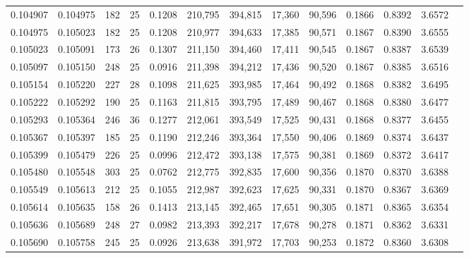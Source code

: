 \begin{tabular}{rrrrrrrrrrrrr}
0.104907 & 0.104975 & 182 &  25 &                                     0.1208 & 210,795 & 394,815 &  17,360 &  90,596 & 0.1866 & 0.8392 & 3.6572 \\
0.104975 & 0.105023 & 182 &  25 &                                     0.1208 & 210,977 & 394,633 &  17,385 &  90,571 & 0.1867 & 0.8390 & 3.6555 \\
0.105023 & 0.105091 & 173 &  26 &                                     0.1307 & 211,150 & 394,460 &  17,411 &  90,545 & 0.1867 & 0.8387 & 3.6539 \\
0.105097 & 0.105150 & 248 &  25 &                                     0.0916 & 211,398 & 394,212 &  17,436 &  90,520 & 0.1867 & 0.8385 & 3.6516 \\
0.105154 & 0.105220 & 227 &  28 &                                     0.1098 & 211,625 & 393,985 &  17,464 &  90,492 & 0.1868 & 0.8382 & 3.6495 \\
0.105222 & 0.105292 & 190 &  25 &                                     0.1163 & 211,815 & 393,795 &  17,489 &  90,467 & 0.1868 & 0.8380 & 3.6477 \\
0.105293 & 0.105364 & 246 &  36 &                                     0.1277 & 212,061 & 393,549 &  17,525 &  90,431 & 0.1868 & 0.8377 & 3.6455 \\
0.105367 & 0.105397 & 185 &  25 &                                     0.1190 & 212,246 & 393,364 &  17,550 &  90,406 & 0.1869 & 0.8374 & 3.6437 \\
0.105399 & 0.105479 & 226 &  25 &                                     0.0996 & 212,472 & 393,138 &  17,575 &  90,381 & 0.1869 & 0.8372 & 3.6417 \\
0.105480 & 0.105548 & 303 &  25 &                                     0.0762 & 212,775 & 392,835 &  17,600 &  90,356 & 0.1870 & 0.8370 & 3.6388 \\
0.105549 & 0.105613 & 212 &  25 &                                     0.1055 & 212,987 & 392,623 &  17,625 &  90,331 & 0.1870 & 0.8367 & 3.6369 \\
0.105614 & 0.105635 & 158 &  26 &                                     0.1413 & 213,145 & 392,465 &  17,651 &  90,305 & 0.1871 & 0.8365 & 3.6354 \\
0.105636 & 0.105689 & 248 &  27 &                                     0.0982 & 213,393 & 392,217 &  17,678 &  90,278 & 0.1871 & 0.8362 & 3.6331 \\
0.105690 & 0.105758 & 245 &  25 &                                     0.0926 & 213,638 & 391,972 &  17,703 &  90,253 & 0.1872 & 0.8360 & 3.6308 \\

\end{tabular}
